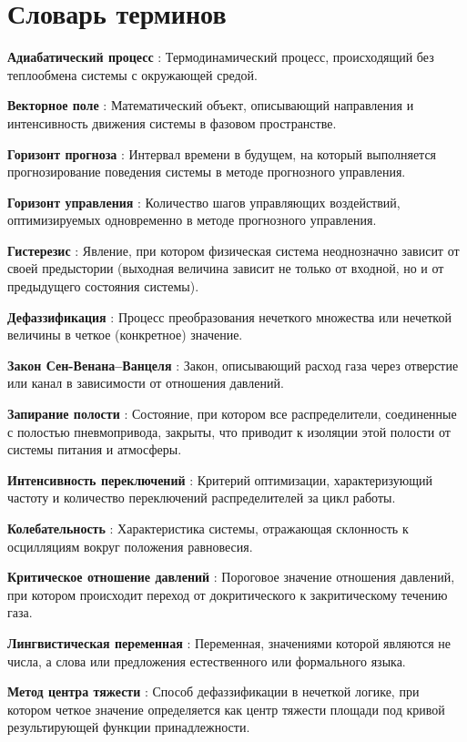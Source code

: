 \chapter*{Словарь терминов}             %

\textbf{Адиабатический процесс} : Термодинамический процесс, происходящий без теплообмена системы с окружающей средой.

\textbf{Векторное поле} : Математический объект, описывающий направления и интенсивность движения системы в фазовом пространстве.

\textbf{Горизонт прогноза} : Интервал времени в будущем, на который выполняется прогнозирование поведения системы в методе прогнозного управления.

\textbf{Горизонт управления} : Количество шагов управляющих воздействий, оптимизируемых одновременно в методе прогнозного управления.

\textbf{Гистерезис} : Явление, при котором физическая система неоднозначно зависит от своей предыстории (выходная величина зависит не только от входной, но и от предыдущего состояния системы).

\textbf{Дефаззификация} : Процесс преобразования нечеткого множества или нечеткой величины в четкое (конкретное) значение.

\textbf{Закон Сен-Венана--Ванцеля} : Закон, описывающий расход газа через отверстие или канал в зависимости от отношения давлений.

\textbf{Запирание полости} : Состояние, при котором все распределители, соединенные с полостью пневмопривода, закрыты, что приводит к изоляции этой полости от системы питания и атмосферы.

\textbf{Интенсивность переключений} : Критерий оптимизации, характеризующий частоту и количество переключений распределителей за цикл работы.

\textbf{Колебательность} : Характеристика системы, отражающая склонность к осцилляциям вокруг положения равновесия.

\textbf{Критическое отношение давлений} : Пороговое значение отношения давлений, при котором происходит переход от докритического к закритическому течению газа.

\textbf{Лингвистическая переменная} : Переменная, значениями которой являются не числа, а слова или предложения естественного или формального языка.

\textbf{Метод центра тяжести} : Способ дефаззификации в нечеткой логике, при котором четкое значение определяется как центр тяжести площади под кривой результирующей функции принадлежности.

